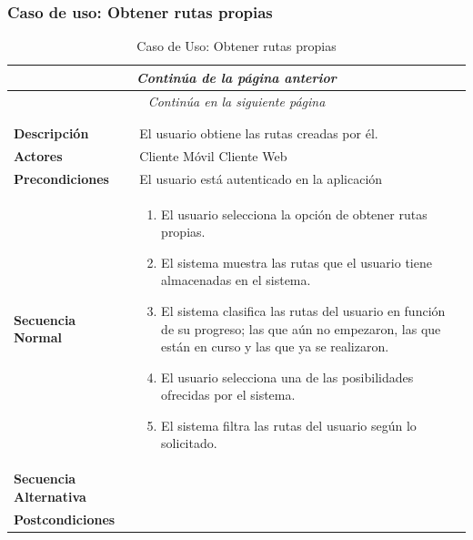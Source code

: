 \subsubsection*{Caso de uso: Obtener rutas propias}
\begin{longtable}{| p{4cm} | p{10cm} |}
\endfirsthead
\multicolumn{2}{c}{\textit{Continúa de la página anterior}}\\[12pt]
\hline
\endhead
\hline
\multicolumn{2}{c}{\textit{Continúa en la siguiente página}} \\
\endfoot
\hline
\caption{Caso de Uso: Obtener rutas propias}\label{fig:1}\\
\endlastfoot


\hline
\multicolumn{2}{|c|}{\textbf{CU$<$05$>$ - Obtener Rutas Propias}} \\

\hline
\textbf{Descripción} &
El usuario obtiene las rutas creadas por él.\\

\hline
\textbf{Actores} &
Cliente Móvil\newline
Cliente Web\\

\hline
\textbf{Precondiciones} &
El usuario está autenticado en la aplicación\\

\hline
\textbf{Secuencia Normal} &\mbox{}\par\vspace{-\baselineskip}
\begin{enumerate}[leftmargin=0.7cm, topsep=0.1cm]
\item El usuario selecciona la opción de obtener rutas propias.
\item El sistema muestra las rutas que el usuario tiene almacenadas en el sistema.
\item El sistema clasifica las rutas del usuario en función de su progreso; las que aún no empezaron, las que están en curso y las que ya se realizaron.
\item El usuario selecciona una de las posibilidades ofrecidas por el sistema.
\item El sistema filtra las rutas del usuario según lo solicitado.
\end{enumerate}\\

\hline
\textbf{Secuencia Alternativa} &\mbox{}\par\vspace{-\baselineskip}
\\

\hline
\textbf{Postcondiciones} & 
\\
\hline
\end{longtable}




